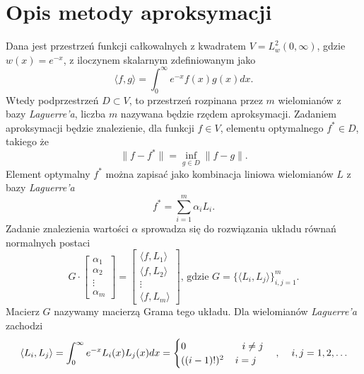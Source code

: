 \documentclass[a4paper,12pt]{article}
\begin{document}
\section*{Opis metody aproksymacji}
Dana jest przestrzeń funkcji całkowalnych z kwadratem $V = L^2_w(0,\infty)$, gdzie $w(x) = e^{-x}$, z iloczynem skalarnym zdefiniowanym jako
\begin{equation}
\langle f,g \rangle = \int^{\infty}_0 e^{-x}f(x)g(x)dx.
\end{equation}
Wtedy podprzestrzeń $D \subset V$, to przestrzeń rozpinana przez $m$ wielomianów z bazy \textit{Laguerre'a}, liczba $m$ nazywana będzie rzędem aproksymacji. Zadaniem aproksymacji będzie znalezienie, dla funkcji $f \in V$, elementu optymalnego $f^* \in D$, takiego że
\begin{equation*}
    \| f - f^* \| = \inf_{g \in D} \| f - g \|.
\end{equation*}
Element optymalny $f^*$ można zapisać jako kombinacja liniowa wielomianów $L$ z bazy \textit{Laguerre'a}
\begin{equation*}
    f^* = \sum^m_{i=1} \alpha_i L_i.
\end{equation*}
Zadanie znalezienia wartości $\alpha$ sprowadza się do rozwiązania układu równań normalnych postaci
\begin{equation}
    G \cdot \begin{bmatrix}
    \alpha_1\\
    \alpha_2\\
    \vdots\\
    \alpha_m
    \end{bmatrix}
     = \begin{bmatrix}
         \langle f,L_1\rangle\\
         \langle f,L_2\rangle\\
         \vdots\\
         \langle f,L_m\rangle
     \end{bmatrix}\text{, gdzie } G = \{\langle L_i, L_j \rangle \}^m_{i, j = 1}.
\end{equation}
Macierz $G$ nazywamy macierzą Grama tego układu. Dla wielomianów \textit{Laguerre'a} zachodzi
\begin{equation*}
    \langle L_i,L_j \rangle = \int^\infty_0 e^{-x}L_i(x)L_j(x)dx = 
    \begin{cases}
    0\hspace{2cm} i \ne j\\
    ((i-1)!)^2 \hspace{0.40cm} i = j
    \end{cases},
    \hspace{0.4cm} i,j = 1,2, \hdots
\end{equation*}
\end{document}
